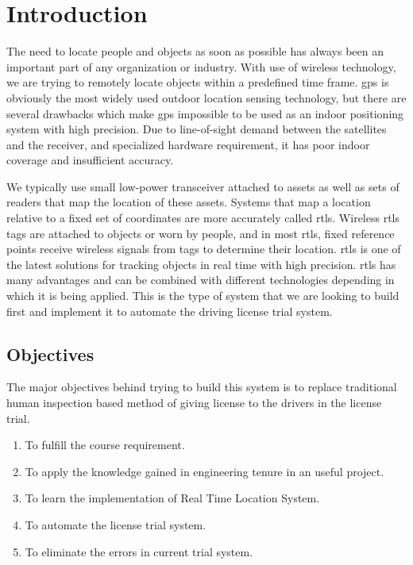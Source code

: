 \section{Introduction}
The need to locate people and objects as soon as possible has always been an important part of any organization or industry. With use of wireless technology, we are trying to remotely locate objects within a predefined time frame. \gls{gps} is obviously the most widely used outdoor location sensing technology, but there are several drawbacks which make \gls{gps} impossible to be used as an indoor positioning system with high precision. Due to line-of-sight demand between the satellites and the receiver, and specialized hardware requirement, it has poor indoor coverage and insufficient accuracy\cite{Insufficient}. 

We typically use small low-power transceiver attached to assets as well as sets of readers that map the location of these assets. Systems that map a location relative to a fixed set of coordinates are more accurately called \gls{rtls}. Wireless \gls{rtls} tags are attached to objects or worn by people, and in most \gls{rtls}, fixed reference points receive wireless signals from tags to determine their location. \gls{rtls} is one of the latest solutions for tracking objects in real time with high precision. \gls{rtls} has many advantages and can be combined with different technologies depending in which it is being applied. This is the type of system that we are looking to build first and implement it to automate the driving license trial system.


\subsection{Objectives}
The major objectives behind trying to build this system is to replace traditional human inspection based method of giving license to the drivers in the license trial.  
\begin{enumerate}
\item To fulfill the course requirement.
\item To apply the knowledge gained in engineering tenure in an useful project.
\item To learn the implementation of Real Time Location System.
\item To automate the license trial system.
\item To eliminate the errors in current trial system.

\end{enumerate}



